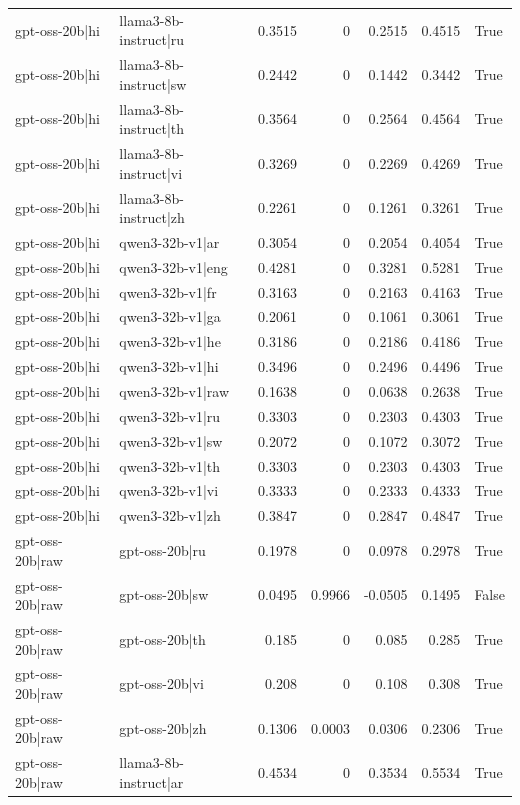 \begin{table}
\begin{tabular}{l l r r r r l}
gpt-oss-20b|hi & llama3-8b-instruct|ru & 0.3515 & 0 & 0.2515 & 0.4515 & True \\
gpt-oss-20b|hi & llama3-8b-instruct|sw & 0.2442 & 0 & 0.1442 & 0.3442 & True \\
gpt-oss-20b|hi & llama3-8b-instruct|th & 0.3564 & 0 & 0.2564 & 0.4564 & True \\
gpt-oss-20b|hi & llama3-8b-instruct|vi & 0.3269 & 0 & 0.2269 & 0.4269 & True \\
gpt-oss-20b|hi & llama3-8b-instruct|zh & 0.2261 & 0 & 0.1261 & 0.3261 & True \\
gpt-oss-20b|hi & qwen3-32b-v1|ar & 0.3054 & 0 & 0.2054 & 0.4054 & True \\
gpt-oss-20b|hi & qwen3-32b-v1|eng & 0.4281 & 0 & 0.3281 & 0.5281 & True \\
gpt-oss-20b|hi & qwen3-32b-v1|fr & 0.3163 & 0 & 0.2163 & 0.4163 & True \\
gpt-oss-20b|hi & qwen3-32b-v1|ga & 0.2061 & 0 & 0.1061 & 0.3061 & True \\
gpt-oss-20b|hi & qwen3-32b-v1|he & 0.3186 & 0 & 0.2186 & 0.4186 & True \\
gpt-oss-20b|hi & qwen3-32b-v1|hi & 0.3496 & 0 & 0.2496 & 0.4496 & True \\
gpt-oss-20b|hi & qwen3-32b-v1|raw & 0.1638 & 0 & 0.0638 & 0.2638 & True \\
gpt-oss-20b|hi & qwen3-32b-v1|ru & 0.3303 & 0 & 0.2303 & 0.4303 & True \\
gpt-oss-20b|hi & qwen3-32b-v1|sw & 0.2072 & 0 & 0.1072 & 0.3072 & True \\
gpt-oss-20b|hi & qwen3-32b-v1|th & 0.3303 & 0 & 0.2303 & 0.4303 & True \\
gpt-oss-20b|hi & qwen3-32b-v1|vi & 0.3333 & 0 & 0.2333 & 0.4333 & True \\
gpt-oss-20b|hi & qwen3-32b-v1|zh & 0.3847 & 0 & 0.2847 & 0.4847 & True \\
gpt-oss-20b|raw & gpt-oss-20b|ru & 0.1978 & 0 & 0.0978 & 0.2978 & True \\
gpt-oss-20b|raw & gpt-oss-20b|sw & 0.0495 & 0.9966 & -0.0505 & 0.1495 & False \\
gpt-oss-20b|raw & gpt-oss-20b|th & 0.185 & 0 & 0.085 & 0.285 & True \\
gpt-oss-20b|raw & gpt-oss-20b|vi & 0.208 & 0 & 0.108 & 0.308 & True \\
gpt-oss-20b|raw & gpt-oss-20b|zh & 0.1306 & 0.0003 & 0.0306 & 0.2306 & True \\
gpt-oss-20b|raw & llama3-8b-instruct|ar & 0.4534 & 0 & 0.3534 & 0.5534 & True \\

\end{tabular}
\end{table}
